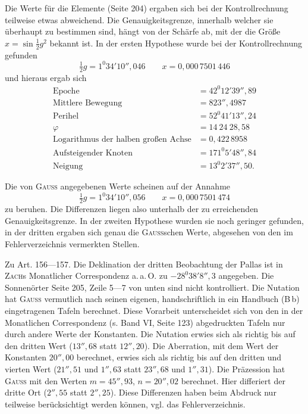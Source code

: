 Die Werte für die Elemente (Seite 204) ergaben sich bei der Kontrollrechnung teilweise
etwas abweichend. Die Genauigkeitsgrenze, innerhalb welcher sie überhaupt zu bestimmen
sind, hängt von der Schärfe ab, mit der die Größe $x = \sin\tfrac12 g^2$ bekannt ist. In
der ersten Hypothese wurde bei der Kontrollrechnung gefunden
\[
\tfrac12 g = 1^0 34' 10''{,}046 \qquad x = 0{,}000\,7501\,446
\]
und hieraus ergab sich
\[
\begin{aligned}
\text{Epoche} &= 42^0 12' 39''{,}89 \\
\text{Mittlere Bewegung} &= 823''{,}4987 \\
\text{Perihel} &= 52^0 41' 13''{,}24 \\
\varphi &= 14\ 24\ 28{,}58 \\
\text{Logarithmus der halben großen Achse} &= 0{,}422\,8958 \\
\text{Aufsteigender Knoten} &= 171^0 5' 48''{,}84 \\
\text{Neigung} &= 13^0 2' 37''{,}50.
\end{aligned}
\]

Die von \textsc{Gauss} angegebenen Werte scheinen auf der Annahme
\[
\tfrac12 g = 1^0 34' 10''{,}056 \qquad x = 0{,}000\,7501\,474
\]
zu beruhen. Die Differenzen liegen also unterhalb der zu erreichenden Genauigkeitsgrenze.
In der zweiten Hypothese wurden sie noch geringer gefunden, in der dritten ergaben sich
genau die \textsc{Gauss}schen Werte, abgesehen von den im Fehlerverzeichnis vermerkten
Stellen.

Zu Art. 156---157. Die Deklination der dritten Beobachtung der Pallas ist in
\textsc{Zach}s Monatlicher Correspondenz a.\,a.\,O. zu $-28^0 38' 8''{,}3$ angegeben. Die
Sonnenörter Seite 205, Zeile 5---7 von unten sind nicht kontrolliert. Die Nutation hat
\textsc{Gauss} vermutlich nach seinen eigenen, handschriftlich in ein Handbuch (B\,b)
eingetragenen Tafeln berechnet. Diese Vorarbeit unterscheidet sich von den in der
Monatlichen Correspondenz (s. Band VI, Seite 123) abgedruckten Tafeln nur durch andere
Werte der Konstanten. Die Nutation erwies sich als richtig
bis auf den dritten Wert ($13''{,}68$ statt $12''{,}20$). Die Aberration, mit dem Wert der
Konstanten $20''{,}00$ berechnet, erwies sich als richtig bis auf den dritten und vierten Wert ($21''{,}51$ und $1''{,}63$ statt
$23''{,}68$ und $1''{,}31$). Die Präzession hat \textsc{Gauss} mit den Werten $m = 45''{,}93$,
$n = 20''{,}02$ berechnet. Hier differiert der dritte Ort ($2''{,}55$ statt $2''{,}25$). Diese
Differenzen haben beim Abdruck nur teilweise berücksichtigt werden können, vgl. das
Fehlerverzeichnis.

